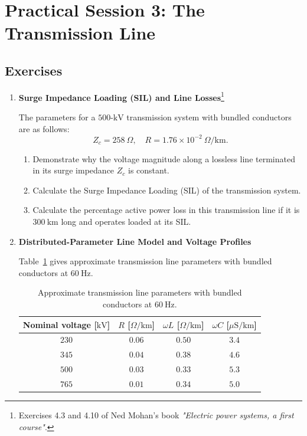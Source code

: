 \section{Practical Session 3: The Transmission Line}

\subsection{Exercises}
\begin{enumerate}
    \item \textbf{Surge Impedance Loading (SIL) and Line Losses}\footnote{Exercises 4.3 and 4.10 of Ned Mohan's book \textit{"Electric power systems, a first course"}.}
    
    The parameters for a $500\text{-kV}$ transmission system with bundled conductors are as follows:
    \[
    Z_c = 258\ \Omega,\quad R = 1.76 \times 10^{-2}\ \Omega/\text{km}.
    \]
    \begin{enumerate}
        \item Demonstrate why the voltage magnitude along a lossless line terminated in its surge impedance $Z_c$ is constant.
        \item Calculate the Surge Impedance Loading (SIL) of the transmission system.
        \item Calculate the percentage active power loss in this transmission line if it is $300\ \text{km}$ long and operates loaded at its SIL.
    \end{enumerate}

    \item \textbf{Distributed-Parameter Line Model and Voltage Profiles}
    
    Table~\ref{tab:tp3_params} gives approximate transmission line parameters with bundled conductors at $60\ \text{Hz}$.
    
    \begin{table}[htbp]
        \centering
        \caption{Approximate transmission line parameters with bundled conductors at $60\ \text{Hz}$.}
        \label{tab:tp3_params}
        \renewcommand{\arraystretch}{1.2}
        \begin{tabular}{cccc}
            \toprule
            \textbf{Nominal voltage} [$\text{kV}$] & $R$ [$\Omega/\text{km}$] & $\omega L$ [$\Omega/\text{km}$] & $\omega C$ [$\mu\text{S/km}$] \\
            \midrule
            $230$ & $0.06$ & $0.50$ & $3.4$ \\
            $345$ & $0.04$ & $0.38$ & $4.6$ \\
            $500$ & $0.03$ & $0.33$ & $5.3$ \\
            $765$ & $0.01$ & $0.34$ & $5.0$ \\
            \bottomrule
        \end{tabular}
    \end{table}


\end{enumerate}
